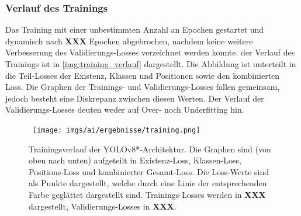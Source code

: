 \subsubsection{Verlauf des Trainings}

Das Training mit einer unbestimmten Anzahl an Epochen gestartet und dynamisch nach \textbf{XXX} Epochen abgebrochen, nachdem keine weitere Verbesserung des Validierungs-Losses verzeichnet werden konnte. der Verlauf des Trainings ist in \autoref{img:training_verlauf} dargestellt. Die Abbildung ist unterteilt in die Teil-Losses der Existenz, Klassen und Positionen sowie den kombinierten Loss. Die Graphen der Trainings- und Validierungs-Losses fallen gemeinsam, jedoch besteht eine Diskrepanz zwischen diesen Werten. Der Verlauf der Validierungs-Losses deuten weder auf Over- noch Underfitting hin.

\begin{figure}
    \centering\
    \texttt{[image: imgs/ai/ergebnisse/training.png]}
    \caption{Trainingsverlauf der YOLOv8*-Architektur. Die Graphen sind (von oben nach unten) aufgeteilt in Existenz-Loss, Klassen-Loss, Positions-Loss und kombinierter Gesamt-Loss. Die Loss-Werte sind als Punkte dargestellt, welche durch eine Linie der entsprechenden Farbe geglättet dargestellt sind. Trainings-Losses werden in \textbf{XXX} dargestellt, Validierungs-Losses in \textbf{XXX}.}
    \label{img:training_verlauf}
\end{figure}

